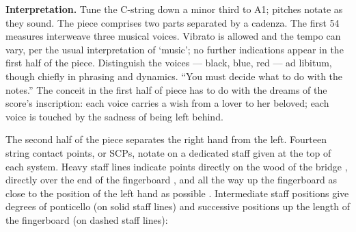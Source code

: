 \newcommand*\circled[1]{\tikz[baseline=(char.base)]{
            \node[shape=circle,draw,inner sep=2pt] (char) {#1};}}

\textbf{Interpretation.} Tune the C-string down a minor third to A1; pitches
notate as they sound. The piece comprises two parts separated by a cadenza. The
first 54 measures interweave three musical voices. Vibrato is allowed and the
tempo can vary, per the usual interpretation of `music'; no further indications
appear in the first half of the piece. Distinguish the voices --- black, blue,
red --- ad libitum, though chiefly in phrasing and dynamics. ``You must decide
what to do with the notes.'' The conceit in the first half of piece has to do
with the dreams of the score's inscription: each voice carries a wish from a
lover to her beloved; each voice is touched by the sadness of being left
behind.

The second half of the piece separates the right hand from the left. Fourteen
string contact points, or SCPs, notate on a dedicated staff given at the top of
each system. Heavy staff lines indicate points directly on the wood
of the bridge
\raisebox{0.125 em}{\scalebox{0.45}{\circled{OB}}},
directly over the end of the
fingerboard
\raisebox{0.125 em}{\scalebox{0.45}{\circled{T0}}},
and all the way up the fingerboard as
close to the position of the left hand as possible
\raisebox{0.125 em}{\scalebox{0.45}{\circled{T+}}}.
Intermediate staff positions give degrees of
ponticello (on solid staff lines) and successive positions up the length of the
fingerboard (on dashed staff lines):
